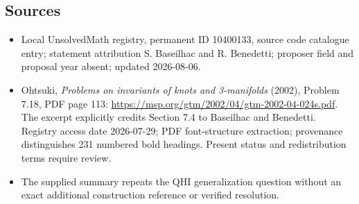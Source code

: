 \documentclass[11pt]{article}
\begin{document}
\subsection{Sources}
\begin{itemize}
\item Local UnsolvedMath registry, permanent ID 10400133, source code catalogue entry; statement attribution S. Baseilhac and R. Benedetti; proposer field and proposal year absent; updated 2026-08-06.
\item Ohtsuki, \emph{Problems on invariants of knots and 3-manifolds} (2002), Problem 7.18, PDF page 113: \url{https://msp.org/gtm/2002/04/gtm-2002-04-024s.pdf}. The excerpt explicitly credits Section 7.4 to Baseilhac and Benedetti. Registry access date 2026-07-29; PDF font-structure extraction; provenance distinguishes 231 numbered bold headings. Present status and redistribution terms require review.
\item The supplied summary repeats the QHI generalization question without an exact additional construction reference or verified resolution.
\end{itemize}
\end{document}
